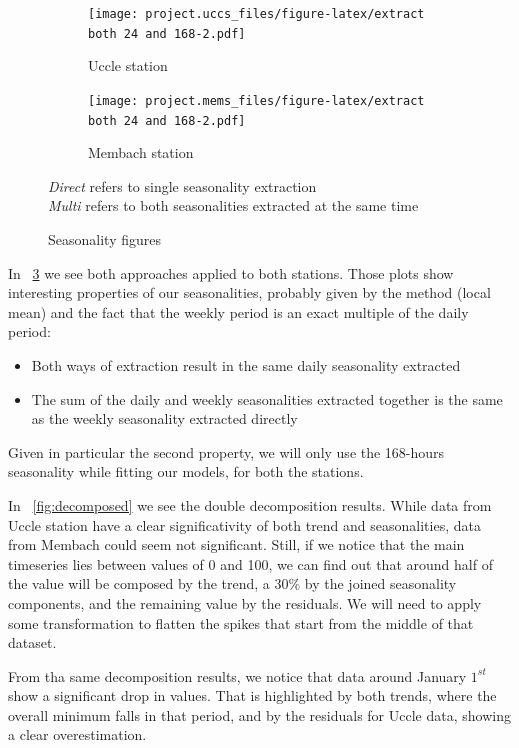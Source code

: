 \documentclass[12pt]{article}
\begin{document}
\begin{figure}[h]
	\begin{subfigure}{.5\linewidth}
		\texttt{[image: project.uccs\_files/figure-latex/extract both 24 and 168-2.pdf]}
		\caption{Uccle station}
		\label{fig:direct-multi-seasonality:uccs}
	\end{subfigure}
	\begin{subfigure}{.5\linewidth}
		\texttt{[image: project.mems\_files/figure-latex/extract both 24 and 168-2.pdf]}
		\caption{Membach station}
		\label{fig:direct-multi-seasonality:mems}
	\end{subfigure}
	\caption{Seasonality figures}{\centering\small\textit{Direct} refers to single seasonality extraction\\\centering\textit{Multi} refers to both seasonalities extracted at the same time\\}
	\label{fig:direct-multi-seasonality}
\end{figure}
%
In \figurename~\ref{fig:direct-multi-seasonality} we see both approaches applied to both stations. Those plots show interesting properties of our seasonalities, probably given by the method (local mean) and the fact that the weekly period is an exact multiple of the daily period:
\begin{itemize}[topsep=0.5em,itemsep=0em,partopsep=0.5em]
	\item Both ways of extraction result in the same daily seasonality extracted
	\item The sum of the daily and weekly seasonalities extracted together is the same as the weekly seasonality extracted directly
\end{itemize}
Given in particular the second property, we will only use the 168-hours seasonality while fitting our models, for both the stations.

In \figurename~\ref{fig:decomposed} we see the double decomposition results. While data from Uccle station have a clear significativity of both trend and seasonalities, data from Membach could seem not significant. Still, if we notice that the main timeseries lies between values of 0 and 100, we can find out that around half of the value will be composed by the trend, a 30\% by the joined seasonality components, and the remaining value by the residuals. We will need to apply some transformation to flatten the spikes that start from the middle of that dataset.

From tha same decomposition results, we notice that data around January $1^{st}$ show a significant drop in values. That is highlighted by both trends, where the overall minimum falls in that period, and by the residuals for Uccle data, showing a clear overestimation.
\end{document}
